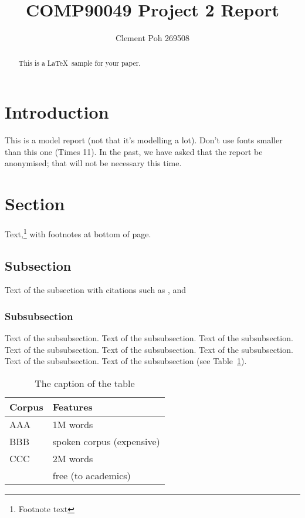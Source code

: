 \documentclass[11pt]{article}
\title{COMP90049 Project 2 Report}
\author
{Clement Poh 269508}
\begin{document}
\maketitle


\begin{abstract}
This is a \LaTeX\ sample for your paper.
\end{abstract}

\section{Introduction}

This is a model report (not that it's modelling a lot). Don't use fonts smaller
than this one (Times 11). In the past, we have asked that the report be
anonymised; that will not be necessary this time.


\section{Section}

Text,\footnote{Footnote text} with footnotes at bottom of page.


\subsection{Subsection}

Text of the subsection with citations such as 
,  and  

 
\subsubsection{Subsubsection}

Text of the subsubsection.
Text of the subsubsection.
Text of the subsubsection.
Text of the subsubsection.
Text of the subsubsection.
Text of the subsubsection.
Text of the subsubsection.
Text of the subsubsection (see Table~\ref{table1}).

\begin{table}[h]
 \begin{center}
\begin{tabular}{|l|l|}

      \hline
      Corpus & Features\\
      \hline\hline
      AAA & 1M words\\
      BBB & spoken corpus (expensive)\\
      CCC & 2M words\\
        & free (to academics)\\
      \hline

\end{tabular}
\caption{The caption of the table}\label{table1}
 \end{center}
\end{table}
\end{document}
